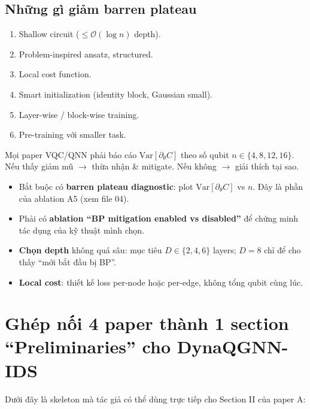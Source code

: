 \documentclass[11pt,a4paper]{article}
\begin{document}
\subsection{Những gì giảm barren plateau}
\begin{enumerate}
  \item Shallow circuit ($\leq \mathcal{O}(\log n)$ depth).
  \item Problem-inspired ansatz, structured.
  \item Local cost function.
  \item Smart initialization (identity block, Gaussian small).
  \item Layer-wise / block-wise training.
  \item Pre-training với smaller task.
\end{enumerate}

\begin{warn}
Mọi paper VQC/QNN phải báo cáo $\mathrm{Var}[\partial_\theta C]$ theo số qubit $n \in \{4, 8, 12, 16\}$. Nếu thấy giảm mũ $\rightarrow$ thừa nhận \& mitigate. Nếu không $\rightarrow$ giải thích tại sao.
\end{warn}

\begin{take}
\begin{itemize}
  \item Bắt buộc có \textbf{barren plateau diagnostic}: plot $\mathrm{Var}[\partial_\theta C]$ vs $n$. Đây là phần của ablation A5 (xem file 04).
  \item Phải có \textbf{ablation ``BP mitigation enabled vs disabled''} để chứng minh tác dụng của kỹ thuật mình chọn.
  \item \textbf{Chọn depth} không quá sâu: mục tiêu $D \in \{2, 4, 6\}$ layers; $D = 8$ chỉ để cho thấy ``mới bắt đầu bị BP''.
  \item \textbf{Local cost}: thiết kế loss per-node hoặc per-edge, không tổng qubit cùng lúc.
\end{itemize}
\end{take}

\section{Ghép nối 4 paper thành 1 section ``Preliminaries'' cho DynaQGNN-IDS}

Dưới đây là skeleton mà tác giả có thể dùng trực tiếp cho Section II của paper A:
\end{document}

